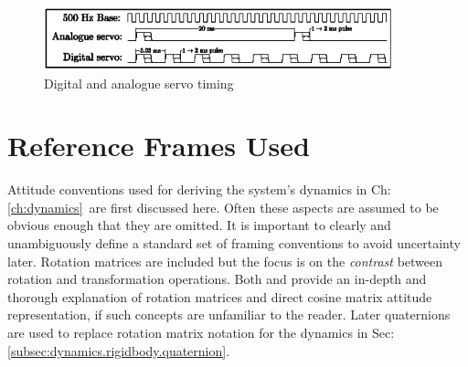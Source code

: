 \begin{figure}
\centering
\includegraphics[width=0.9\textwidth]{figs/servo-timing}
\caption{Digital and analogue servo timing}
\label{fig:servo-timing}
\vspace{-20pt}
\end{figure}
\section{Reference Frames Used}
\label{sec:proto.conventions}
Attitude conventions used for deriving the system's dynamics in Ch:\ref{ch:dynamics}~are first discussed here. Often these aspects are assumed to be obvious enough that they are omitted. It is important to clearly and unambiguously define a standard set of framing conventions to avoid uncertainty later. Rotation matrices are included but the focus is on the \emph{contrast} between rotation and transformation operations. Both \cite{spacecraftattitutdequaternions} and \cite{rigidbodylecture} provide an in-depth and thorough explanation of rotation matrices and direct cosine matrix attitude representation, if such concepts are unfamiliar to the reader. Later quaternions are used to replace rotation matrix notation for the dynamics in Sec:\ref{subsec:dynamics.rigidbody.quaternion}.
